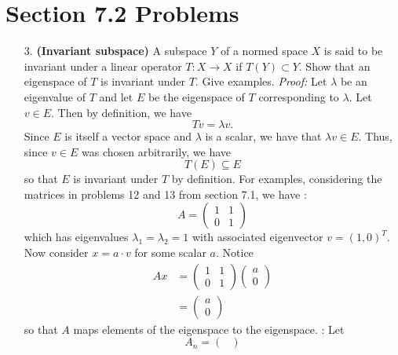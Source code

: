 \documentclass{article}
\begin{document}
\section*{Section 7.2 Problems}
\begin{itemize}
    \item[3.] \textbf{(Invariant subspace)} A subspace $Y$ of a normed space $X$ is said to be invariant under a linear operator $T: X \to X$ if $T(Y) \subset Y$. Show that an eigenspace of $T$ is invariant under $T$. Give examples. 
    \newline\newline
    \textit{Proof:} Let $\lambda$ be an eigenvalue of $T$ and let $E$ be the eigenspace of $T$ corresponding to $\lambda$. Let $v \in E$. Then by definition, we have
    \[Tv = \lambda v.\]
    Since $E$ is itself a vector space and $\lambda$ is a scalar, we have that $\lambda v \in E$. Thus, since $v \in E$ was chosen arbitrarily, we have
    \[T(E) \subseteq E\]
    so that $E$ is invariant under $T$ by definition.
    \newline\newline
    For examples, considering the matrices in problems 12 and 13 from section 7.1, we have
    : 
    \[A = \begin{pmatrix}
        1 & 1\\
        0 & 1
    \end{pmatrix}\]
    which has eigenvalues $\lambda_1 = \lambda_2 = 1$ with associated eigenvector $v = (1,0)^T$. Now consider $x = a\cdot v$ for some scalar $a$. Notice
    \begin{align*}
        Ax &= \begin{pmatrix}
            1 & 1\\
            0 & 1
        \end{pmatrix}\begin{pmatrix}
            a\\
            0
        \end{pmatrix}\\
        &= \begin{pmatrix}
            a\\
            0
        \end{pmatrix}
    \end{align*}
    so that $A$ maps elements of the eigenspace to the eigenspace.
    : Let 
    \[A_n = \begin{pmatrix}

\end{pmatrix}\]
\end{itemize}
\end{document}
